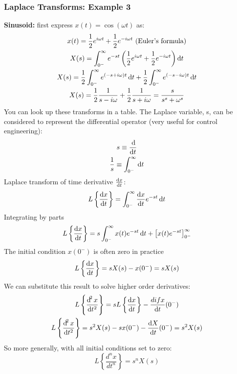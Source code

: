 \subsubsection{Laplace Transforms: Example 3}
\textbf{Sinusoid:} first express $x(t) = \cos{(\omega t)}$ as:
\begin{gather}
  x(t) = \frac{1}{2} e^{i \omega t} + \frac{1}{2} e^{-i \omega t} \textrm{ (Euler's formula)}\\
  X(s) = \int_{0^-}^\infty e^{-st} \left( \frac{1}{2} e^{i \omega t} + \frac{1}{2} e^{-i \omega t} \right) \dif t\\
  X(s) = \frac{1}{2} \int_{0^-}^\infty e^{(-s + i \omega)t}\dif t + \frac{1}{2} \int_{0^-}^\infty e^{(-s - i \omega)t} \dif t\\
  X(s) = \frac{1}{2} \frac{1}{s - i \omega} + \frac{1}{2} \frac{1}{s + i \omega} = \frac{s}{s^s + \omega^s}
\end{gather}
You can look up these transforms in a table. The Laplace variable, s, can be considered to represent the differential operator (very useful for control engineering):
\begin{gather}
  s \equiv \frac{\dif}{\dif t}\\
  \frac{1}{s} \equiv \int_{0^-}^\infty \dif t
\end{gather}
Laplace transform of time derivative $\frac{\dif x}{\dif t}$:
\begin{equation}
  L \left\{ \frac{\dif x}{\dif t} \right\} = \int_{0^-}^\infty \frac{\dif x}{\dif t} e^{-st} \dif t
\end{equation}
Integrating by parts
\begin{equation}
  L \left\{ \frac{\dif x}{\dif t} \right\} = s \int_{0^-}^\infty x(t) e^{-st} \dif t + \left[ x(t)e^{-st} \right]_{0^-}^\infty
\end{equation}
The initial condition $x(0^-)$ is often zero in practice
\begin{equation}
  L \left\{ \frac{\dif x}{\dif t} \right\} = sX(s) - x(0^-) = sX(s)
\end{equation}
We can substitute this result to solve higher order derivatives:
\begin{gather}
  L\left\{ \frac{\dif^2 x}{\dif t^2} \right\} = sL\left\{ \frac{\dif x}{\dif t} \right\} - \frac{dif x}{\dif t} (0^-)\\
  L\left\{ \frac{\dif^2 x}{\dif t^2} \right\} = s^2 X(s) - sx(0^-) - \frac{\dif X}{\dif t} (0^-) = s^2 X(s)
\end{gather}
So more generally, with all initial conditions set to zero:
\begin{equation}
  L\left\{ \frac{d^n x}{dt^n} \right\} = s^n X(s)
\end{equation}
